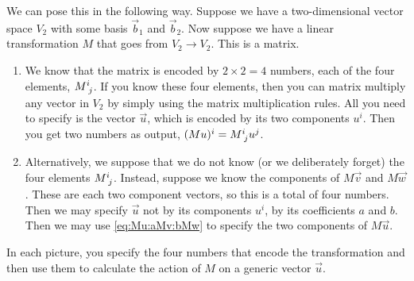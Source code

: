 \documentclass[12pt]{article}
\begin{document}
We can pose this in the following way. Suppose we have a two-dimensional vector space $V_2$
 with some basis $\vec{b}_1$ and $\vec{b}_2$. Now suppose we have a linear transformation $M$ that goes from $V_2\to V_2$. This is a matrix. 
\begin{enumerate}
    \item We know that the matrix is encoded by $2\times 2= 4$ numbers, each of the four elements, $M\aij{i}{j}$. If you know these four elements, then you can matrix multiply any vector in $V_2$ by simply using the matrix multiplication rules. All you need to specify is the vector $\vec{u}$, which is encoded by its two components $u^i$. Then you get two numbers as output, $(Mu)^i = M\aij{i}{j}u^j$.
    \item Alternatively, we suppose that we do not know (or we deliberately forget) the four elements $M\aij{i}{j}$. Instead, suppose we know the components of $M\vec{v}$ and $M\vec{w}$. These are each two component vectors, so this is a total of four numbers. Then we may specify $\vec{u}$ not by its components $u^i$, by its coefficients $a$ and $b$. Then we may use \eqref{eq:Mu:aMv:bMw} to specify the two components of $M\vec{u}$.
\end{enumerate}
In each picture, you specify the four numbers that encode the transformation and then use them to calculate the action of $M$ on a generic vector $\vec{u}$. 
\end{document}
